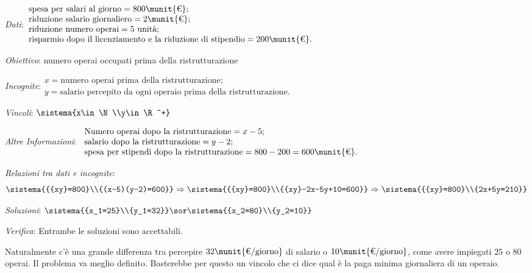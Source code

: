 \begin{soluzione}~

\vspace{-.5em}
\emph{Dati}:\( \begin{array}{l}
\text{spesa per salari al giorno}= 800\munit{\text{€}};\\
\text{riduzione salario giornaliero}= 2\munit{\text{€}};\\
\text{riduzione numero operai}= 5\text{ unità};\\
\text{risparmio dopo il licenziamento e la riduzione di stipendio}= 
200\munit{\text{€}}.
\end{array}\)

\emph{Obiettivo}: numero operai occupati prima della ristrutturazione

\emph{Incognite}:\( \begin{array}{l}
x = \text{numero operai prima della ristrutturazione};\\
y = \text{salario percepito da ogni operaio prima della 
ristrutturazione}.
\end{array}\)

\emph{Vincoli}: \(\sistema{x\in \N\\y\in \R^+}\)

\emph{Altre Informazioni}: \( \begin{array}{l}
\text{Numero operai dopo la ristrutturazione} = x-5;\\
\text{salario dopo la ristrutturazione} =y-2;\\
\text{spesa per stipendi dopo la ristrutturazione} 
=800-200=600\munit{\text{€}}.\end{array}\)

\emph{Relazioni tra dati e incognite}:\\[-1em]
\begin{equation*}
\sistema{{{xy}=800}\\{(x-5)(y-2)=600}}\Rightarrow 
\sistema{{{xy}=800}\\{{xy}-2x-5y+10=600}}\Rightarrow 
\sistema{{{xy}=800}\\{2x+5y=210}}
\end{equation*}

\emph{Soluzioni}: 
\(\sistema{{x_1=25}\\{y_1=32}} \sor 
\sistema{{x_2=80}\\{y_2=10}}\)

\emph{Verifica}: Entrambe le soluzioni sono accettabili.
\end{soluzione}

Naturalmente c'è una grande differenza tra percepire 
\(32\munit{\text{€/giorno}}\) 
di salario o \( 10\munit{\text{€/giorno}} \), come avere impiegati 
\( 25 \) o \( 80 \) operai. 
Il problema va meglio definito. Basterebbe per questo un vincolo che 
ci dice qual è la paga minima giornaliera di un operaio.

